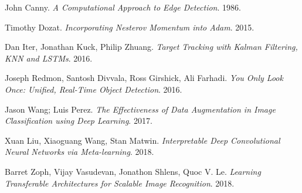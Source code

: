 \documentclass[12pt]{article}%
\begin{document}
\begin{thebibliography}{9}
John Canny. 
\textit{A Computational Approach to Edge Detection}. 
1986.

Timothy Dozat.
\textit{Incorporating Nesterov Momentum into Adam}.
2015.
 
Dan Iter, Jonathan Kuck, Philip Zhuang.
\textit{Target Tracking with Kalman Filtering, KNN and LSTMs}.
2016.

Joseph Redmon, Santosh Divvala, Ross Girshick, Ali Farhadi.
\textit{You Only Look Once: Unified, Real-Time Object Detection}.
2016.
 
Jason Wang; Luis Perez.
\textit{The Effectiveness of Data Augmentation in Image Classification using Deep Learning}.
2017.
 
Xuan Liu, Xiaoguang Wang, Stan Matwin.
\textit{Interpretable Deep Convolutional Neural Networks via Meta-learning}.
2018.

Barret Zoph, Vijay Vasudevan, Jonathon Shlens, Quoc V. Le.
\textit{Learning Transferable Architectures for Scalable Image Recognition}.
2018.
\end{thebibliography}
\end{document}
